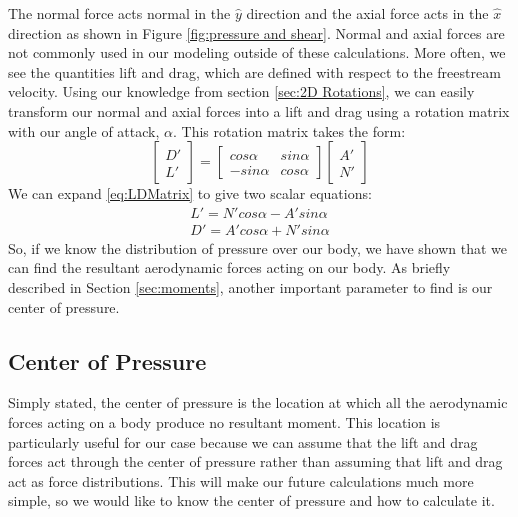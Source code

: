 \documentclass[12pt]{report}
\begin{document}
The normal force acts normal in the $\hat{y}$ direction and the axial force acts in the $\hat {x}$ direction as shown in Figure \ref{fig:pressure and shear}. Normal and axial forces are not commonly used in our modeling outside of these calculations. More often, we see the quantities lift and drag, which are defined with respect to the \gls{freestream} velocity. Using our knowledge from section \ref{sec:2D Rotations}, we can easily transform our normal and axial forces into a lift and drag using a rotation matrix with our \gls{angle of attack}, $\alpha$. This rotation matrix takes the form:
\begin{equation}\label{eq:LDMatrix}
 \begin{bmatrix}
     D'\\L'
 \end{bmatrix}
 =\begin{bmatrix}
        cos\alpha &sin\alpha\\
        -sin\alpha&cos\alpha
    \end{bmatrix}
    \begin{bmatrix}
        A'\\N'
    \end{bmatrix}
\end{equation}
We can expand \eqref{eq:LDMatrix} to give two scalar equations:
\begin{gather}
        L'=N'cos\alpha-A'sin\alpha\\
        D'=A'cos\alpha+N'sin\alpha
\end{gather}
So, if we know the distribution of pressure over our body, we have shown that we can find the resultant aerodynamic forces acting on our body. As briefly described in Section \ref{sec:moments}, another important parameter to find is our center of pressure.
\subsection{Center of Pressure}
Simply stated, the center of pressure is the location at which all the aerodynamic forces acting on a body produce no resultant moment. This location is particularly useful for our case because we can assume that the lift and drag forces act through the center of pressure rather than assuming that lift and drag act as force distributions. This will make our future calculations much more simple, so we would like to know the center of pressure and how to calculate it.
\end{document}
